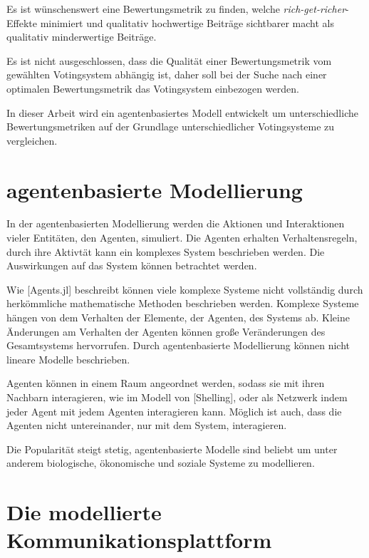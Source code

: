 
Es ist wünschenswert eine Bewertungsmetrik zu finden, welche \textit{rich-get-richer}-Effekte minimiert und qualitativ hochwertige Beiträge sichtbarer macht als qualitativ minderwertige Beiträge.

Es ist nicht ausgeschlossen, dass die Qualität einer Bewertungsmetrik vom gewählten Votingsystem abhängig ist, daher soll bei der Suche nach einer optimalen Bewertungsmetrik das Votingsystem einbezogen werden.

In dieser Arbeit wird ein agentenbasiertes Modell entwickelt um unterschiedliche Bewertungsmetriken auf der Grundlage unterschiedlicher Votingsysteme zu vergleichen.




\section{agentenbasierte Modellierung}

In der agentenbasierten Modellierung werden die Aktionen und Interaktionen vieler Entitäten, den Agenten, simuliert. Die Agenten erhalten Verhaltensregeln, durch ihre Aktivtät kann ein komplexes System beschrieben werden. Die Auswirkungen auf das System können betrachtet werden.

Wie [Agents.jl] beschreibt können viele komplexe Systeme nicht vollständig durch herkömmliche mathematische Methoden beschrieben werden. Komplexe Systeme hängen von dem Verhalten der Elemente, der Agenten, des Systems ab. Kleine Änderungen am Verhalten der Agenten können große Veränderungen des Gesamtsystems hervorrufen. Durch agentenbasierte Modellierung können nicht lineare Modelle beschrieben.

Agenten können in einem Raum angeordnet werden, sodass sie mit ihren Nachbarn interagieren, wie im Modell von [Shelling], oder als Netzwerk indem jeder Agent mit jedem Agenten interagieren kann. Möglich ist auch, dass die Agenten nicht untereinander, nur mit dem System, interagieren.

Die Popularität steigt stetig, agentenbasierte Modelle sind beliebt um unter anderem biologische, ökonomische und soziale Systeme zu modellieren.

\section{Die modellierte Kommunikationsplattform}

